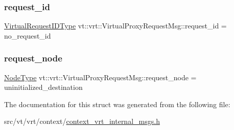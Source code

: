 \subsubsection{\texorpdfstring{request\+\_\+id}{request\_id}}
{\footnotesize\ttfamily \hyperlink{namespacevt_1_1vrt_ac7ef8820ebfc383fa16f09bf46eaa2b8}{Virtual\+Request\+I\+D\+Type} vt\+::vrt\+::\+Virtual\+Proxy\+Request\+Msg\+::request\+\_\+id = no\+\_\+request\+\_\+id}

\mbox{\label{structvt_1_1vrt_1_1_virtual_proxy_request_msg_a17ef52708baa6ba8c47e5a8b7e3a0eb9}} 
\subsubsection{\texorpdfstring{request\+\_\+node}{request\_node}}
{\footnotesize\ttfamily \hyperlink{namespacevt_a866da9d0efc19c0a1ce79e9e492f47e2}{Node\+Type} vt\+::vrt\+::\+Virtual\+Proxy\+Request\+Msg\+::request\+\_\+node = uninitialized\+\_\+destination}



The documentation for this struct was generated from the following file\+:\begin{DoxyCompactItemize}
\item 
src/vt/vrt/context/\hyperlink{context__vrt__internal__msgs_8h}{context\+\_\+vrt\+\_\+internal\+\_\+msgs.\+h}\end{DoxyCompactItemize}
